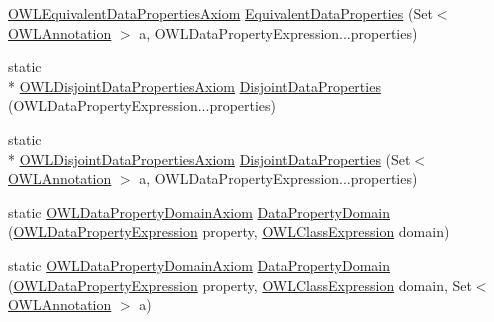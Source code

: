 \begin{DoxyCompactItemize}
\hyperlink{interfaceorg_1_1semanticweb_1_1owlapi_1_1model_1_1_o_w_l_equivalent_data_properties_axiom}{O\-W\-L\-Equivalent\-Data\-Properties\-Axiom} \hyperlink{classorg_1_1semanticweb_1_1owlapi_1_1apibinding_1_1_o_w_l_functional_syntax_factory_a09a2eaf8a4a816455c64696c18e4ad2c}{Equivalent\-Data\-Properties} (Set$<$ \hyperlink{interfaceorg_1_1semanticweb_1_1owlapi_1_1model_1_1_o_w_l_annotation}{O\-W\-L\-Annotation} $>$ a, O\-W\-L\-Data\-Property\-Expression...\-properties)
\item 
static \\*
\hyperlink{interfaceorg_1_1semanticweb_1_1owlapi_1_1model_1_1_o_w_l_disjoint_data_properties_axiom}{O\-W\-L\-Disjoint\-Data\-Properties\-Axiom} \hyperlink{classorg_1_1semanticweb_1_1owlapi_1_1apibinding_1_1_o_w_l_functional_syntax_factory_aac11c32119d6b4e4230220dc53380b9c}{Disjoint\-Data\-Properties} (O\-W\-L\-Data\-Property\-Expression...\-properties)
\item 
static \\*
\hyperlink{interfaceorg_1_1semanticweb_1_1owlapi_1_1model_1_1_o_w_l_disjoint_data_properties_axiom}{O\-W\-L\-Disjoint\-Data\-Properties\-Axiom} \hyperlink{classorg_1_1semanticweb_1_1owlapi_1_1apibinding_1_1_o_w_l_functional_syntax_factory_a715eed96a048e9c7e08ec823e186ac29}{Disjoint\-Data\-Properties} (Set$<$ \hyperlink{interfaceorg_1_1semanticweb_1_1owlapi_1_1model_1_1_o_w_l_annotation}{O\-W\-L\-Annotation} $>$ a, O\-W\-L\-Data\-Property\-Expression...\-properties)
\item 
static \hyperlink{interfaceorg_1_1semanticweb_1_1owlapi_1_1model_1_1_o_w_l_data_property_domain_axiom}{O\-W\-L\-Data\-Property\-Domain\-Axiom} \hyperlink{classorg_1_1semanticweb_1_1owlapi_1_1apibinding_1_1_o_w_l_functional_syntax_factory_affef95d846b36a0d1a34c04b2eefec98}{Data\-Property\-Domain} (\hyperlink{interfaceorg_1_1semanticweb_1_1owlapi_1_1model_1_1_o_w_l_data_property_expression}{O\-W\-L\-Data\-Property\-Expression} property, \hyperlink{interfaceorg_1_1semanticweb_1_1owlapi_1_1model_1_1_o_w_l_class_expression}{O\-W\-L\-Class\-Expression} domain)
\item 
static \hyperlink{interfaceorg_1_1semanticweb_1_1owlapi_1_1model_1_1_o_w_l_data_property_domain_axiom}{O\-W\-L\-Data\-Property\-Domain\-Axiom} \hyperlink{classorg_1_1semanticweb_1_1owlapi_1_1apibinding_1_1_o_w_l_functional_syntax_factory_a6de9f1b2c36b18baadbbc6f2e237f37b}{Data\-Property\-Domain} (\hyperlink{interfaceorg_1_1semanticweb_1_1owlapi_1_1model_1_1_o_w_l_data_property_expression}{O\-W\-L\-Data\-Property\-Expression} property, \hyperlink{interfaceorg_1_1semanticweb_1_1owlapi_1_1model_1_1_o_w_l_class_expression}{O\-W\-L\-Class\-Expression} domain, Set$<$ \hyperlink{interfaceorg_1_1semanticweb_1_1owlapi_1_1model_1_1_o_w_l_annotation}{O\-W\-L\-Annotation} $>$ a)

\end{DoxyCompactItemize}
